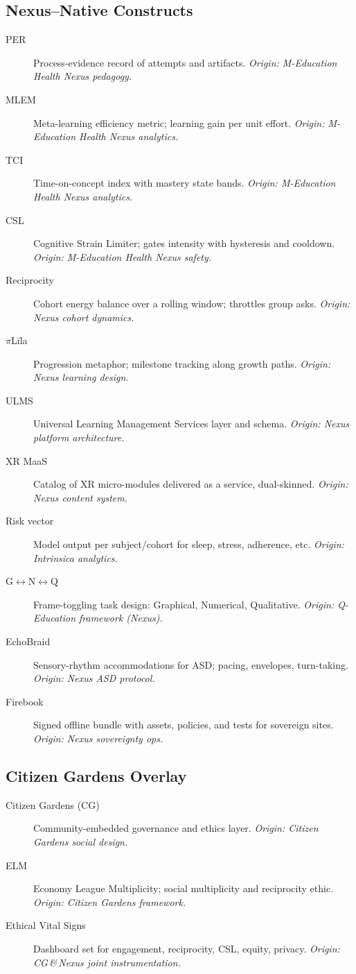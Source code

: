 \documentclass[11pt]{article}
\theoremstyle{plain}
\begin{document}
\subsection*{Nexus–Native Constructs}
\begin{description}
  \item[PER] Process-evidence record of attempts and artifacts. \emph{Origin: M-Education Health Nexus pedagogy.}
  \item[MLEM] Meta-learning efficiency metric; learning gain per unit effort. \emph{Origin: M-Education Health Nexus analytics.}
  \item[TCI] Time-on-concept index with mastery state bands. \emph{Origin: M-Education Health Nexus analytics.}
  \item[CSL] Cognitive Strain Limiter; gates intensity with hysteresis and cooldown. \emph{Origin: M-Education Health Nexus safety.}
  \item[Reciprocity] Cohort energy balance over a rolling window; throttles group asks. \emph{Origin: Nexus cohort dynamics.}
  \item[$\pi$Līla] Progression metaphor; milestone tracking along growth paths. \emph{Origin: Nexus learning design.}
  \item[ULMS] Universal Learning Management Services layer and schema. \emph{Origin: Nexus platform architecture.}
  \item[XR MaaS] Catalog of XR micro-modules delivered as a service, dual-skinned. \emph{Origin: Nexus content system.}
  \item[Risk vector] Model output per subject/cohort for sleep, stress, adherence, etc. \emph{Origin: Intrinsica analytics.}
  \item[G$\leftrightarrow$N$\leftrightarrow$Q] Frame-toggling task design: Graphical, Numerical, Qualitative. \emph{Origin: Q-Education framework (Nexus).}
  \item[EchoBraid] Sensory-rhythm accommodations for ASD; pacing, envelopes, turn-taking. \emph{Origin: Nexus ASD protocol.}
  \item[Firebook] Signed offline bundle with assets, policies, and tests for sovereign sites. \emph{Origin: Nexus sovereignty ops.}
\end{description}

\subsection*{Citizen Gardens Overlay}
\begin{description}
  \item[Citizen Gardens (CG)] Community-embedded governance and ethics layer. \emph{Origin: Citizen Gardens social design.}
  \item[ELM] Economy League Multiplicity; social multiplicity and reciprocity ethic. \emph{Origin: Citizen Gardens framework.}
  \item[Ethical Vital Signs] Dashboard set for engagement, reciprocity, CSL, equity, privacy. \emph{Origin: CG\,\&\,Nexus joint instrumentation.}
\end{description}
\end{document}
